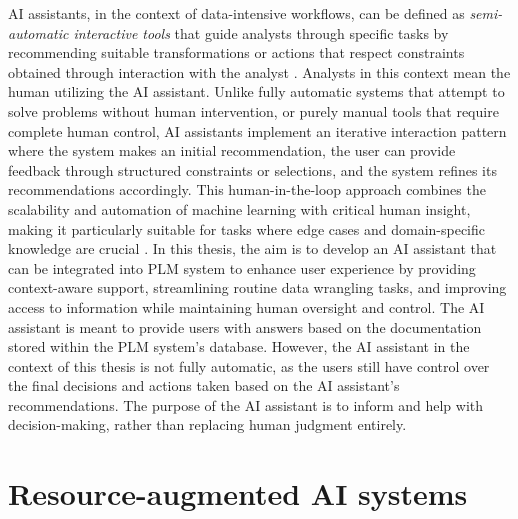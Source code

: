 AI assistants, in the context of data-intensive workflows, can be defined as \textit{semi-automatic interactive tools} that guide analysts through specific tasks by recommending suitable transformations or actions that respect constraints obtained through interaction with the analyst \parencite{petricek_ai_2023}. Analysts in this context mean the human utilizing the AI assistant. Unlike fully automatic systems that attempt to solve problems without human intervention, or purely manual tools that require complete human control, AI assistants implement an iterative interaction pattern where the system makes an initial recommendation, the user can provide feedback through structured constraints or selections, and the system refines its recommendations accordingly. This human-in-the-loop approach combines the scalability and automation of machine learning with critical human insight, making it particularly suitable for tasks where edge cases and domain-specific knowledge are crucial \parencite{petricek_ai_2023}. In this thesis, the aim is to develop an AI assistant that can be integrated into PLM system to enhance user experience by providing context-aware support, streamlining routine data wrangling tasks, and improving access to information while maintaining human oversight and control. The AI assistant is meant to provide users with answers based on the documentation stored within the PLM system's database. However, the AI assistant in the context of this thesis is not fully automatic, as the users still have control over the final decisions and actions taken based on the AI assistant's recommendations. The purpose of the AI assistant is to inform and help with decision-making, rather than replacing human judgment entirely.

\section{Resource-augmented AI systems}
\label{sec:resource-augmented-ai-systems}

